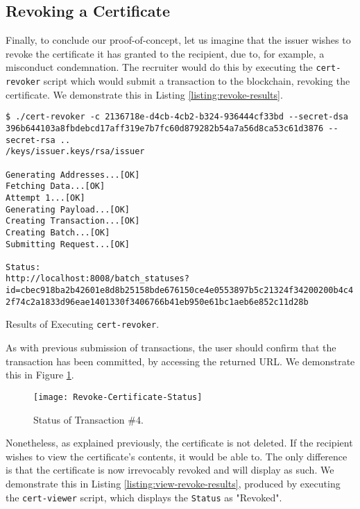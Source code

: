 \subsection{Revoking a Certificate}
\label{sec:impl-revoke}

Finally, to conclude our proof-of-concept, let us imagine that the issuer wishes to revoke the certificate it has granted to the recipient, due to, for example, a misconduct condemnation. The recruiter would do this by executing the \texttt{cert-revoker} script which would submit a transaction to the blockchain, revoking the certificate. We demonstrate this in Listing \ref{listing:revoke-results}.

\begin{listing}[ht]
	\begin{verbatim}
$ ./cert-revoker -c 2136718e-d4cb-4cb2-b324-936444cf33bd --secret-dsa 396b644103a8fbdebcd17aff319e7b7fc60d879282b54a7a56d8ca53c61d3876 --secret-rsa ..
/keys/issuer.keys/rsa/issuer

Generating Addresses...[OK]
Fetching Data...[OK]
Attempt 1...[OK]
Generating Payload...[OK]
Creating Transaction...[OK]
Creating Batch...[OK]
Submitting Request...[OK]

Status:
http://localhost:8008/batch_statuses?id=cbec918ba2b42601e8d8b25158bde676150ce4e0553897b5c21324f34200200b4c4
2f74c2a1833d96eae1401330f3406766b41eb950e61bc1aeb6e852c11d28b

\end{verbatim}
	\caption{Results of Executing \texttt{cert-revoker}.}
	\label{listing:revoke-results}
\end{listing}

As with previous submission of transactions, the user should confirm that the transaction has been committed, by accessing the returned URL. We demonstrate this in Figure \ref{fig:revoke-status}.

\begin{figure}[htb]
	\centering
	\texttt{[image: Revoke-Certificate-Status]}
	\caption{Status of Transaction \#4.}
	\label{fig:revoke-status}
\end{figure}

Nonetheless, as explained previously, the certificate is not deleted. If the recipient wishes to view the certificate's contents, it would be able to. The only difference is that the certificate is now irrevocably revoked and will display as such. We demonstrate this in Listing \ref{listing:view-revoke-results}, produced by executing the \texttt{cert-viewer} script, which displays the \texttt{Status} as "Revoked".

